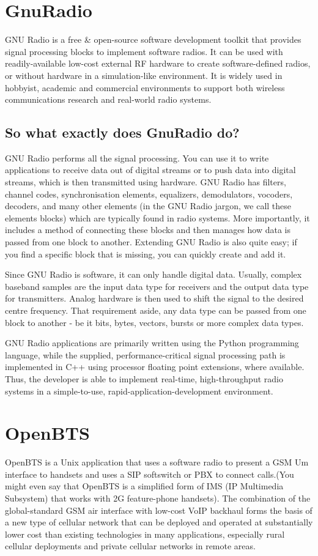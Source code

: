 \section{GnuRadio}
GNU Radio is a free & open-source software development toolkit that provides signal processing blocks to implement software radios. It can be used with readily-available low-cost external RF hardware to create software-defined radios, or without hardware in a simulation-like environment. It is widely used in hobbyist, academic and commercial environments to support both wireless communications research and real-world radio systems.
\subsection{So what exactly does GnuRadio do?}
GNU Radio performs all the signal processing. You can use it to write applications to receive data out of digital streams or to push data into digital streams, which is then transmitted using hardware. GNU Radio has filters, channel codes, synchronisation elements, equalizers, demodulators, vocoders, decoders, and many other elements (in the GNU Radio jargon, we call these elements blocks) which are typically found in radio systems. More importantly, it includes a method of connecting these blocks and then manages how data is passed from one block to another. Extending GNU Radio is also quite easy; if you find a specific block that is missing, you can quickly create and add it.

Since GNU Radio is software, it can only handle digital data. Usually, complex baseband samples are the input data type for receivers and the output data type for transmitters. Analog hardware is then used to shift the signal to the desired centre frequency. That requirement aside, any data type can be passed from one block to another - be it bits, bytes, vectors, bursts or more complex data types.

GNU Radio applications are primarily written using the Python programming language, while the supplied, performance-critical signal processing path is implemented in C++ using processor floating point extensions, where available. Thus, the developer is able to implement real-time, high-throughput radio systems in a simple-to-use, rapid-application-development environment.

\section{OpenBTS}
OpenBTS is a Unix application that uses a software radio to present a GSM Um interface to handsets and uses a SIP softswitch or PBX to connect calls.(You might even say that OpenBTS is a simplified form of IMS (IP Multimedia Subsystem) that works with 2G feature-phone handsets). The combination of the global-standard GSM air interface with low-cost VoIP backhaul forms the basis of a new type of cellular network that can be deployed and operated at substantially lower cost than existing technologies in many applications, especially rural cellular deployments and private cellular networks in remote areas. 
